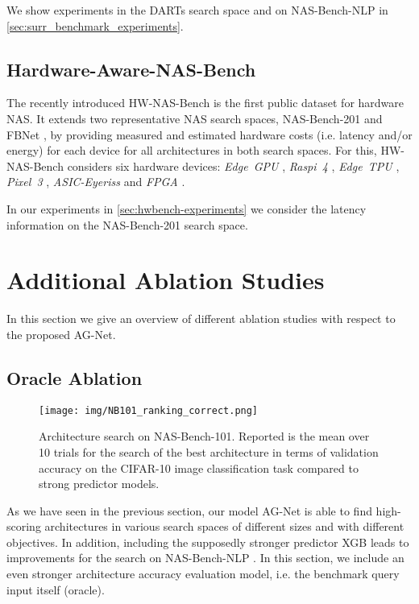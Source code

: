 \documentclass[runningheads]{llncs}
\begin{document}
We show experiments in the DARTs search space and on NAS-Bench-NLP in \autoref{sec:surr_benchmark_experiments}.

\subsection{Hardware-Aware-NAS-Bench}
The recently introduced HW-NAS-Bench \cite{2021HWNNB} is the first public dataset for hardware NAS.
It extends two representative NAS search spaces, NAS-Bench-201 \cite{2020NB201} and FBNet \cite{2019FBNet}, by providing measured and estimated hardware costs (i.e. latency and/or energy) for each device for all architectures in both search spaces.
For this, HW-NAS-Bench considers six hardware devices:
\textit{Edge~GPU} \cite{edgegpu}, \textit{Raspi~4} \cite{rapsi4}, \textit{Edge~TPU} \cite{edgetpu}, \textit{Pixel~3} \cite{pixel3}, \textit{ASIC-Eyeriss} \cite{eyeriss} and \textit{FPGA} \cite{fpga_1,fpga_2}.

In our experiments in \autoref{sec:hwbench-experiments} we consider the latency information on the NAS-Bench-201 search space.

\section{Additional Ablation Studies}
\label{supp:sec_ablation}

In this section we give an overview of different ablation studies with respect to the proposed AG-Net.
\subsection{Oracle Ablation}\label{supp:sec_push}
\begin{figure}
	\centering
	\texttt{[image: img/NB101\_ranking\_correct.png]}
	\caption{Architecture search on NAS-Bench-101. Reported is the mean over 10 trials for the search of the best architecture in terms of validation accuracy on the CIFAR-10 image classification task compared to strong predictor models.
		\label{fig:NB101_excellent_search}}
\end{figure}
As we have seen in the previous section, our model AG-Net is able to find high-scoring architectures in various search spaces of different sizes and with different objectives.
In addition, including the supposedly stronger predictor XGB \cite{XGB} leads to improvements for the search on NAS-Bench-NLP \cite{2020NBNLP}.
In this section, we include an even stronger architecture accuracy evaluation model, i.e. the benchmark query input itself (oracle).
\end{document}

